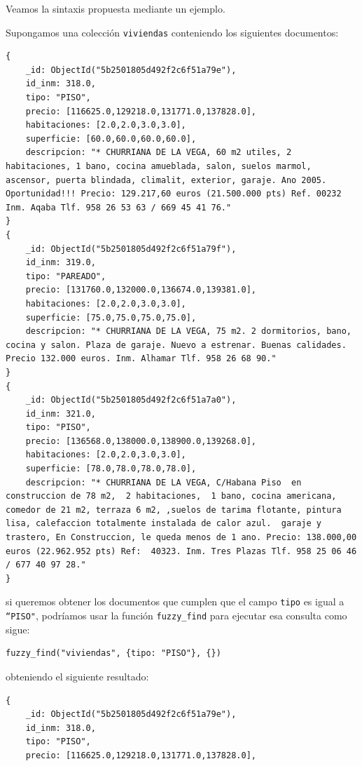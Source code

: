 Veamos la sintaxis propuesta mediante un ejemplo.

\begin{example}\label{example:viviendasqueries}

Supongamos una colección \texttt{viviendas} conteniendo los siguientes documentos:

\begin{lstlisting}[numbers=none]
{
    _id: ObjectId("5b2501805d492f2c6f51a79e"),
    id_inm: 318.0,
    tipo: "PISO",
    precio: [116625.0,129218.0,131771.0,137828.0],
    habitaciones: [2.0,2.0,3.0,3.0],
    superficie: [60.0,60.0,60.0,60.0],
    descripcion: "* CHURRIANA DE LA VEGA, 60 m2 utiles, 2 habitaciones, 1 bano, cocina amueblada, salon, suelos marmol, ascensor, puerta blindada, climalit, exterior, garaje. Ano 2005. Oportunidad!!! Precio: 129.217,60 euros (21.500.000 pts) Ref. 00232 Inm. Aqaba Tlf. 958 26 53 63 / 669 45 41 76."
}
{
    _id: ObjectId("5b2501805d492f2c6f51a79f"),
    id_inm: 319.0,
    tipo: "PAREADO",
    precio: [131760.0,132000.0,136674.0,139381.0],
    habitaciones: [2.0,2.0,3.0,3.0],
    superficie: [75.0,75.0,75.0,75.0],
    descripcion: "* CHURRIANA DE LA VEGA, 75 m2. 2 dormitorios, bano, cocina y salon. Plaza de garaje. Nuevo a estrenar. Buenas calidades. Precio 132.000 euros. Inm. Alhamar Tlf. 958 26 68 90."
}
{
    _id: ObjectId("5b2501805d492f2c6f51a7a0"),
    id_inm: 321.0,
    tipo: "PISO",
    precio: [136568.0,138000.0,138900.0,139268.0],
    habitaciones: [2.0,2.0,3.0,3.0],
    superficie: [78.0,78.0,78.0,78.0],
    descripcion: "* CHURRIANA DE LA VEGA, C/Habana Piso  en construccion de 78 m2,  2 habitaciones,  1 bano, cocina americana, comedor de 21 m2, terraza 6 m2, ,suelos de tarima flotante, pintura lisa, calefaccion totalmente instalada de calor azul.  garaje y trastero, En Construccion, le queda menos de 1 ano. Precio: 138.000,00 euros (22.962.952 pts) Ref:  40323. Inm. Tres Plazas Tlf. 958 25 06 46 / 677 40 97 28."
}
\end{lstlisting}
%
si queremos obtener los documentos que cumplen que el campo \texttt{tipo} es igual a \texttt{``PISO"}, podríamos usar la función \texttt{fuzzy\_find} para ejecutar esa consulta como sigue:
%
\begin{verbatim}
fuzzy_find("viviendas", {tipo: "PISO"}, {})
\end{verbatim}
%
obteniendo el siguiente resultado:
%
\begin{lstlisting}[numbers=none]
{
    _id: ObjectId("5b2501805d492f2c6f51a79e"),
    id_inm: 318.0,
    tipo: "PISO",
    precio: [116625.0,129218.0,131771.0,137828.0],

\end{lstlisting}
\end{example}
